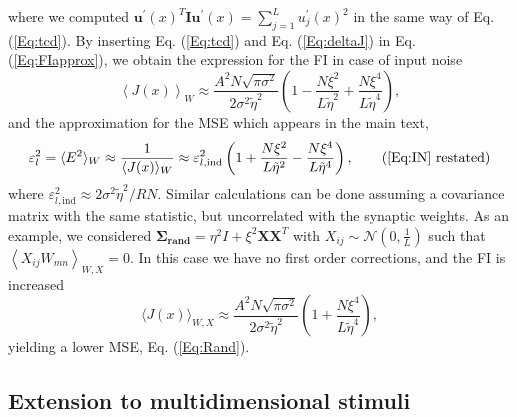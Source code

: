 \documentclass[a4paper]{article}%
\begin{document}
where we computed $\mathbf{u^{\prime}}(x)^{T} \mathbf{I} \mathbf{u^{\prime}%
}(x) = \sum_{j=1}^{L} u^{\prime}_{j}(x)^{2} $ in the same way of Eq.
(\ref{Eq:tcd}). By inserting Eq. (\ref{Eq:tcd}) and Eq. (\ref{Eq:deltaJ}) in
Eq. (\ref{Eq:FIapprox}), we obtain the expression for the FI in case of input
noise
\begin{equation}
\left\langle J(x)\right\rangle _{W} \approx\frac{ A^{2} N \sqrt{\pi\sigma^{2}%
}}{2 \sigma^{2}\tilde\eta^{2}}\left(  1 -\frac{N\xi^{2}}{L\tilde\eta^{2}}+
\frac{N\xi^{4}}{L\tilde\eta^{4}}\right)  ,
\end{equation}
and the approximation for the MSE which appears in the main
text,
\begin{equation}
\varepsilon_{l}^{2} = \langle E^{2}\rangle_{W} \approx\frac{1}{\langle
J(x)\rangle_{W}} \approx\varepsilon_{l,\text{ind}}^{2} \left(  1+\frac
{N\xi^{2}}{L\tilde\eta^{2}} - \frac{N\xi^{4}}{L\tilde\eta^{4}}\right)  ,
\tag{\ref{Eq:IN} restated}%
\end{equation}
where $\varepsilon_{l,\text{ind}}^{2} \approx2\sigma^{2}\tilde\eta^{2}/R N. $
Similar calculations can be done assuming a covariance matrix with the same
statistic, but uncorrelated with the synaptic weights. As an example, we
considered $\bm{\Sigma_{rand}} = \eta^{2} I + \xi^{2} \mathbf{X}\mathbf{X}^{T}$
with $X_{ij} \sim\mathcal{N}(0,\frac{1}{L})$ such that $\left\langle
X_{ij}W_{mn}\right\rangle _{W,X}= 0$. In this case we have no first order
corrections, and the FI is increased
\begin{equation}
\langle J(x)\rangle_{W,X} \approx\frac{A^{2} N \sqrt{\pi\sigma^{2}}}{2
\sigma^{2}\tilde\eta^{2}}\left(  1 + \frac{N\xi^{4}}{L\tilde\eta^{4}}\right)
,
\end{equation}
yielding a lower MSE, Eq. (\ref{Eq:Rand}).

\subsection*{Extension to multidimensional stimuli}
\end{document}
